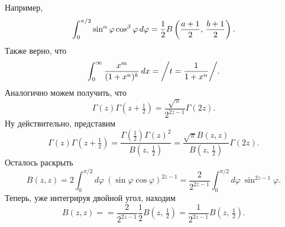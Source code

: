 Например,
\begin{equation*}
    \int_0^{\pi/2} \sin^\alpha \varphi \cos^\beta \varphi \, d \varphi =  \frac{1}{2} B\left(\frac{a+1}{2},\, \frac{b+1}{2}\right).
\end{equation*}
Также верно, что
\begin{equation*}
    \int_{0}^{\infty}  \frac{x^m}{(1+x^n)^k} \, d x = \bigg/
        t = \frac{1}{1+x^n}
    \bigg/.
\end{equation*}
Аналогично можем получить, что
\begin{equation}
    \Gamma(z) \Gamma\left(z + \tfrac{1}{2}\right) = \frac{\sqrt{\pi}}{2^{2z-1}} \Gamma(2 z).
\end{equation}
Ну действительно, представим
\begin{equation*}
    \Gamma(z) \Gamma(z + \tfrac{1}{2}) = \frac{\Gamma(\frac{1}{2}) \Gamma(z)^2}{B(z,\, \tfrac{1}{2})} = 
    \frac{\sqrt{\pi} B(z, z)}{B(z,\, \frac{1}{2})} \Gamma(2z).
\end{equation*}
Осталось раскрыть
\begin{equation*}
    B(z, z) = 2 \int_{0}^{\pi/2} d \varphi\ \left(\sin \varphi \cos \varphi\right)^{2z-1} = 
    \frac{2}{2^{2z-1}} \int_{0}^{\pi/2} d \varphi \ \sin^{2 z-1} \varphi.
\end{equation*}
Теперь, уже интегрируя двойной угол, находим
\begin{equation*}
    B(z, z) =  = \frac{2}{2^{2z-1}} \frac{1}{2} B(z,\, \tfrac{1}{2}) = \frac{1}{2^{2z-1}} B(z,\, \tfrac{1}{2}).
\end{equation*}

